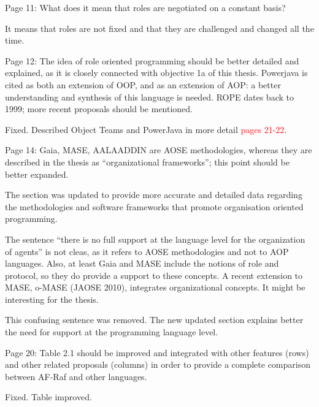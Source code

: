 \documentclass{article}
\newcommand*\R[1]{\textcolor{red}{#1}} %
\newenvironment{them}{\noindent\begingroup\color{blue}}{\endgroup\par}
\begin{document}
\begin{them}

Page 11:
What does it mean that roles are negotiated on a constant basis?
\end{them}
It means that roles are not fixed and that they are challenged and changed all
the time.  

\begin{them}

Page 12:
The idea of role oriented programming should be better detailed and explained,
as it is closely connected with objective 1a of this thesis. Powerjava is cited
as both an extension of OOP, and as an extension of AOP: a better understanding
and synthesis of this language is needed. ROPE dates back to 1999; more recent
proposals should be mentioned.

\end{them}
Fixed. Described Object Teams and PowerJava in more detail \R{pages 21-22}.

\begin{them}

Page 14:
Gaia, MASE, AALAADDIN are AOSE methodologies, whereas they are described in the
thesis as “organizational frameworks”; this point should be better expanded.

\end{them}
The section was updated to provide more accurate and detailed data regarding
the methodologies and software frameworks that promote organisation oriented
programming.

\begin{them}

The sentence “there is no full support at the language level for the
organization of agents” is not cleas, as it refers to AOSE methodologies and
not to AOP languages. Also, at least Gaia and MASE include the notions of role
and protocol, so they do provide a support to these concepts. A recent
extension to MASE, o-MASE (JAOSE 2010), integrates organizational concepts. It
might be interesting for the thesis.

\end{them}
This confusing sentence was removed. The new updated section explains better
the need for support at the programming language level. 

\begin{them}

Page 20:
Table 2.1 should be improved and integrated with other features (rows) and
other related proposals (columns) in order to provide a complete comparison
between AF-Raf and other languages.

\end{them}
Fixed. Table improved.
\end{document}
